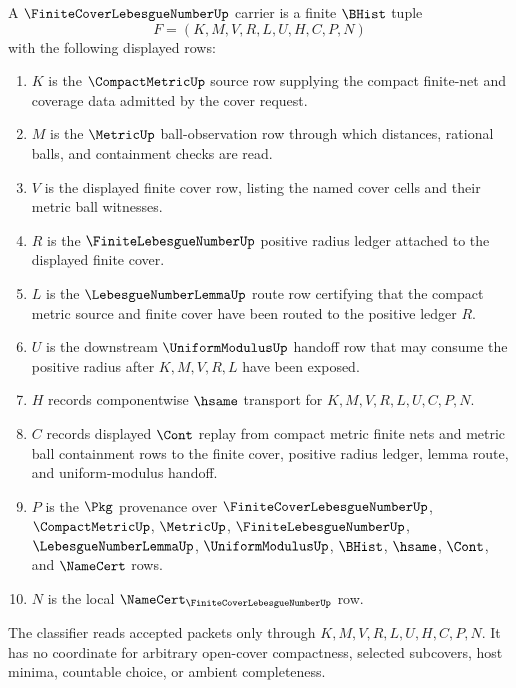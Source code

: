 \begin{definition}
\label{def:finite-cover-lebesgue-number-carrier}
A $\FiniteCoverLebesgueNumberUp$ carrier is a finite $\BHist$ tuple
$$
F=(K,M,V,R,L,U,H,C,P,N)
$$
with the following displayed rows:
\begin{enumerate}
\item $K$ is the $\CompactMetricUp$ source row supplying the compact finite-net and coverage data admitted by the cover request.
\item $M$ is the $\MetricUp$ ball-observation row through which distances, rational balls, and containment checks are read.
\item $V$ is the displayed finite cover row, listing the named cover cells and their metric ball witnesses.
\item $R$ is the $\FiniteLebesgueNumberUp$ positive radius ledger attached to the displayed finite cover.
\item $L$ is the $\LebesgueNumberLemmaUp$ route row certifying that the compact metric source and finite cover have been routed to the positive ledger $R$.
\item $U$ is the downstream $\UniformModulusUp$ handoff row that may consume the positive radius after $K,M,V,R,L$ have been exposed.
\item $H$ records componentwise $\hsame$ transport for $K,M,V,R,L,U,C,P,N$.
\item $C$ records displayed $\Cont$ replay from compact metric finite nets and metric ball containment rows to the finite cover, positive radius ledger, lemma route, and uniform-modulus handoff.
\item $P$ is the $\Pkg$ provenance over $\FiniteCoverLebesgueNumberUp$, $\CompactMetricUp$, $\MetricUp$, $\FiniteLebesgueNumberUp$, $\LebesgueNumberLemmaUp$, $\UniformModulusUp$, $\BHist$, $\hsame$, $\Cont$, and $\NameCert$ rows.
\item $N$ is the local $\NameCert_{\FiniteCoverLebesgueNumberUp}$ row.
\end{enumerate}
The classifier reads accepted packets only through $K,M,V,R,L,U,H,C,P,N$. It has no coordinate for arbitrary open-cover compactness, selected subcovers, host minima, countable choice, or ambient completeness.
\end{definition}

